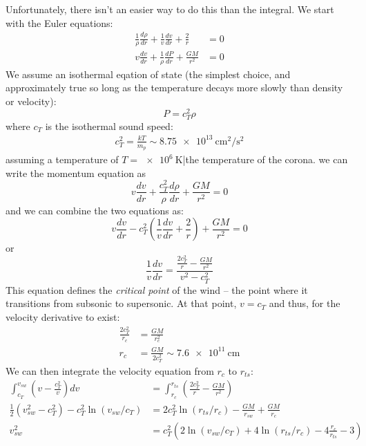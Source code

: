 \documentclass{article}
\begin{document}
			Unfortunately, there isn't an easier way to do this than the integral.  We start with the Euler equations:
			\begin{align}
				\frac{1}{\rho}\frac{d\rho}{dr} + \frac{1}{v}\frac{dv}{dr} + \frac{2}{r} &= 0\\
				v\frac{dv}{dr} + \frac{1}{\rho}\frac{dP}{dr} + \frac{GM}{r^{2}} &= 0 
			\end{align}
			We assume an isothermal eqation of state (the simplest choice, and approximately true so long as the temperature decays more slowly than density or velocity):
			\begin{equation}
				P = c_{T}^{2}\rho
			\end{equation}
			where $c_{T}$ is the isothermal sound speed:
			\begin{align}
				c_{T}^{2} = \frac{kT}{m_{p}} \sim \SI{8.75e13}{\cm\squared\per\second\squared}
			\end{align}
			assuming a temperature of $T=\SI{e6}{\kelvin}$|the temperature of the corona.  we can write the momentum equation as
			\begin{equation}
				v\frac{dv}{dr} + \frac{c_{T}^{2}}{\rho}\frac{d\rho}{dr} + \frac{GM}{r^{2}} = 0 
			\end{equation}
			and we can combine the two equations as:
			\begin{equation}
				v\frac{dv}{dr} -c_{T}^{2}\left(\frac{1}{v}\frac{dv}{dr} + \frac{2}{r}\right) + \frac{GM}{r^{2}} = 0
			\end{equation}
			or
			\begin{equation}
				\frac{1}{v}\frac{dv}{dr} = \frac{\frac{2c_{T}^{2}}{r} - \frac{GM}{r^{2}}}{v^{2}-c_{T}^{2}}
			\end{equation}
			This equation defines the \emph{critical point} of the wind -- the point where it transitions from subsonic to supersonic.  At that point, $v=c_{T}$ and thus, for the velocity derivative to exist:
			\begin{align}
				\frac{2c_{T}^{2}}{r_{c}} &= \frac{GM}{r^{2}_{c}}\\
				r_{c} &= \frac{GM}{2c_{T}^{2}} \sim \SI{7.6e11}{\cm}
			\end{align}
			We can then integrate the velocity equation from $r_{c}$ to $r_{ts}$:
			\begin{align}
				\int_{c_{T}}^{v_{sw}}\left(v - \frac{c_{T}^{2}}{v}\right)dv &= \int_{r_{c}}^{r_{ts}}\left(\frac{2c_{T}^{2}}{r} - \frac{GM}{r^{2}}\right)\\
				\frac{1}{2}(v_{sw}^{2}-c_{T}^{2}) - c_{T}^{2}\ln(v_{sw}/c_{T}) &= 2c_{T}^{2}\ln(r_{ts}/r_{c}) - \frac{GM}{r_{sw}} + \frac{GM}{r_{c}}\\
				v_{sw}^{2} &= c_{T}^{2}\left(2\ln(v_{sw}/c_{T}) + 4\ln(r_{ts}/r_{c}) - 4\frac{r_{c}}{r_{ts}} - 3\right)
			\end{align}
\end{document}
